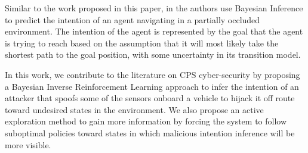 \documentclass[letterpaper, 10 pt, conference]{ieeeconf}  %
\begin{document}

Similar to the work proposed in this paper, in \cite{best2015bayesian} the authors use Bayesian Inference to predict the intention of an agent navigating in a partially occluded environment. The intention of the agent is represented by the goal that the agent is trying to reach based on the assumption that it will most likely take the shortest path to the goal position, with some uncertainty in its transition model.

In this work, we contribute to the literature on CPS cyber-security by proposing a Bayesian Inverse Reinforcement Learning approach to infer the intention of an attacker that spoofs some of the sensors onboard a vehicle to hijack it off route toward undesired states in the environment. We also propose an active exploration method to gain more information by forcing the system to follow suboptimal policies toward states in which malicious intention inference will be more visible.
%
\end{document}
